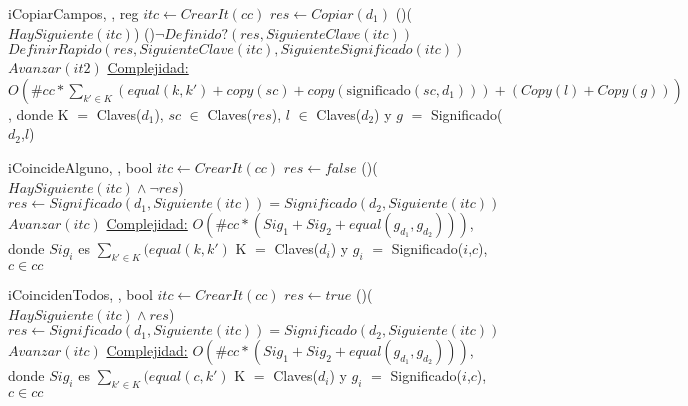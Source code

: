\begin{Algoritmos}
\begin{algoritmo}{iCopiarCampos}{, , }{reg}
    $itc \gets CrearIt(cc) $ 
    $res \gets Copiar(d_1) 	$ 
    \While(){($HaySiguiente(itc)$)}{
     	\If(){$\lnot Definido?(res,SiguienteClave(itc))$}{
			$DefinirRapido(res, SiguienteClave(itc), SiguienteSignificado(itc))$ 
		}
     	$Avanzar(it2)$ 
	}
    \medskip
	\underline{Complejidad:} $O(\#cc*\sum_{k' \in K}(equal(k,k') + copy(sc) + copy(\text{significado}(sc,d_1)))+(Copy(l) + Copy(g)))$, donde K $=$ Claves($d_1$), $sc$ $\in$ Claves($res$), $l$ $\in$ Claves($d_2$) y $g$ $=$ Significado($d_2$,$l$) 
\end{algoritmo}

\begin{algoritmo}{iCoincideAlguno}{, , }{bool}
    $itc \gets CrearIt(cc) $ 
    $res \gets false $ 
    \While(){($HaySiguiente(itc) \land \neg res$)}{
    	$res \gets Significado(d_1,Siguiente(itc)) = Significado(d_2,Siguiente(itc))$ 
	$Avanzar(itc)$ 
    }
    \medskip
	\underline{Complejidad:} $O(\#cc*(Sig_1 + Sig_2 + equal(g_{d_1},g_{d_2})))$, donde $Sig_i$ es $\sum_{k' \in K}(equal(k,k')$ K $=$ Claves($d_i$) y $g_i$ $=$ Significado($i$,$c$), $c \in cc$ 
\end{algoritmo}

\begin{algoritmo}{iCoincidenTodos}{, , }{bool}
    $itc \gets CrearIt(cc) $ 
    $res \gets true $ 
    \While(){($HaySiguiente(itc) \wedge res$)}{
    	$res \gets Significado(d_1,Siguiente(itc)) = Significado(d_2,Siguiente(itc))$ 
		$Avanzar(itc)$ 
	}
    \medskip
	\underline{Complejidad:} $O(\#cc*(Sig_1 + Sig_2 + equal(g_{d_1},g_{d_2})))$, donde $Sig_i$ es $\sum_{k' \in K}(equal(c,k')$ K $=$ Claves($d_i$) y $g_i$ $=$ Significado($i$,$c$), $c \in cc$ 
\end{algoritmo}


\end{Algoritmos}
